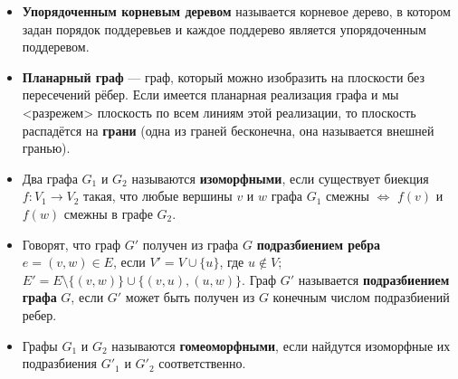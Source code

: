 \begin{itemize}
\item \textbf{Упорядоченным корневым деревом} называется корневое дерево, в котором задан порядок поддеревьев и каждое поддерево является упорядоченным поддеревом.

\item \textbf{Планарный граф} --- граф, который можно изобразить на плоскости без пересечений рёбер.
Если имеется планарная реализация графа и мы <разрежем> плоскость по всем линиям этой реализации, то плоскость распадётся на \textbf{грани} (одна из граней бесконечна, она называется внешней гранью).

\item Два графа $G_1$ и $G_2$ называются \textbf{изоморфными}, если существует биекция $f: V_1 \rightarrow V_2$ такая, что любые вершины $v$ и $w$ графа $G_1$ смежны $\Leftrightarrow$ $f(v)$ и $f(w)$ смежны в графе $G_2$.

\item Говорят, что граф $G'$ получен из графа $G$ \textbf{подразбиением ребра} $e = (v,w) \in E$, если $V' = V \cup \{u\}$, где $u \notin V$; $E' = E \setminus \{(v,w)\} \cup \{(v, u), (u,w)\}$. Граф $G'$ называется \textbf{подразбиением графа} $G$, если $G'$ может быть получен из $G$ конечным числом подразбиений ребер.

\item Графы $G_1$ и $G_2$ называются \textbf{гомеоморфными}, если найдутся изоморфные их подразбиения $G'_1$ и $G'_2$ соответственно.

\end{itemize}

